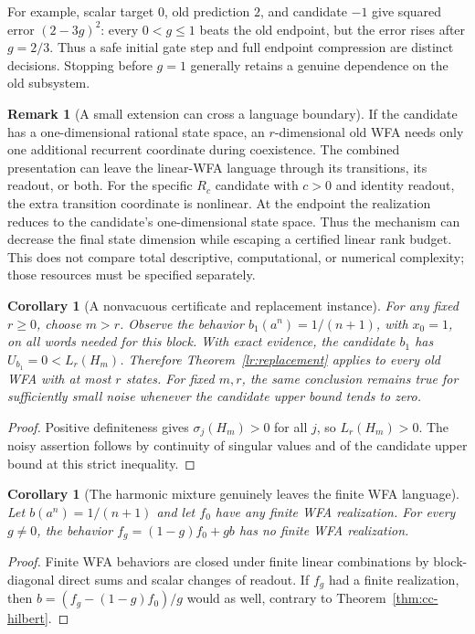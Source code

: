 \documentclass[11pt]{article}
\newtheorem{corollary}[theorem]{Corollary}
\theoremstyle{definition}
\newtheorem{remark}[theorem]{Remark}
\begin{document}
For example, scalar target $0$, old prediction $2$, and candidate $-1$
give squared error $(2-3g)^2$: every $0<g\leq1$ beats the old
endpoint, but the error rises after $g=2/3$. Thus a safe initial gate
step and full endpoint compression are distinct decisions. Stopping
before $g=1$ generally retains a genuine dependence on the old subsystem.

\begin{remark}[A small extension can cross a language boundary]
If the candidate has a one-dimensional rational state space, an
$r$-dimensional old WFA needs only one additional recurrent coordinate
during coexistence. The combined presentation can leave the linear-WFA
language through its transitions, its readout, or both. For the specific
$R_c$ candidate with $c>0$ and identity readout, the extra transition
coordinate is nonlinear. At the endpoint the realization reduces to the
candidate's one-dimensional state space. Thus the mechanism can decrease
the final state dimension while escaping a certified linear rank budget.
This does not compare total descriptive, computational, or numerical
complexity; those resources must be specified separately.
\end{remark}

\begin{corollary}[A nonvacuous certificate and replacement instance]
\label{lr:nonvacuous}
For any fixed $r\geq0$, choose $m>r$. Observe the behavior $b_1(a^n)=1/(n+1)$, with $x_0=1$, on all words
needed for this block. With exact evidence,
the candidate $b_1$ has $U_{b_1}=0<L_r(H_m)$. Therefore
Theorem~\ref{lr:replacement} applies to every old WFA with at most $r$
states. For fixed $m,r$, the same conclusion remains true for sufficiently
small noise whenever the candidate upper bound tends to zero.
\end{corollary}
\begin{proof}
Positive definiteness gives $\sigma_j(H_m)>0$ for all $j$, so
$L_r(H_m)>0$. The noisy assertion follows by continuity of singular
values and of the candidate upper bound at this strict inequality.
\end{proof}

\begin{corollary}[The harmonic mixture genuinely leaves the finite WFA language]
\label{lr:genuine-exit}
Let $b(a^n)=1/(n+1)$ and let $f_0$ have any finite WFA realization.
For every $g\ne0$, the behavior $f_g=(1-g)f_0+gb$ has no finite WFA
realization.
\end{corollary}
\begin{proof}
Finite WFA behaviors are closed under finite linear combinations by
block-diagonal direct sums and scalar changes of readout. If $f_g$ had
a finite realization, then $b=(f_g-(1-g)f_0)/g$ would as well, contrary
to Theorem~\ref{thm:cc-hilbert}.
\end{proof}
\end{document}
